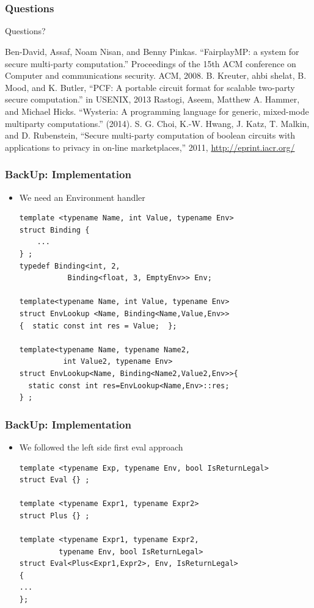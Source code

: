 \documentclass{beamer}
\begin{document}
\section*{}
\begin{frame}
\frametitle{Questions}
Questions?
\end{frame}

\begin{frame}
\begin{thebibliography}{9}
Ben-David, Assaf, Noam Nisan, and Benny Pinkas. ``FairplayMP: a system for secure multi-party computation.'' Proceedings of the 15th ACM conference on Computer and communications security. ACM, 2008.
 B. Kreuter, ahbi shelat, B. Mood, and K. Butler, ``PCF: A portable
circuit format for scalable two-party secure computation.'' in USENIX,
2013
Rastogi, Aseem, Matthew A. Hammer, and Michael Hicks. ``Wysteria: A programming language for generic, mixed-mode multiparty computations.'' (2014).
S. G. Choi, K.-W. Hwang, J. Katz, T. Malkin, and D. Rubenstein,
“Secure multi-party computation of boolean circuits with applications to
privacy in on-line marketplaces,” 2011, \url{http://eprint.iacr.org/}
\end{thebibliography}
\end{frame}

\begin{frame}[fragile]
\frametitle{BackUp: Implementation}
\begin{itemize}
\item We need an Environment handler
\begin{lstlisting}
template <typename Name, int Value, typename Env>
struct Binding {
    ...
} ;
typedef Binding<int, 2,
           Binding<float, 3, EmptyEnv>> Env;
           
template<typename Name, int Value, typename Env>
struct EnvLookup <Name, Binding<Name,Value,Env>> 
{  static const int res = Value;  };

template<typename Name, typename Name2,
          int Value2, typename Env>
struct EnvLookup<Name, Binding<Name2,Value2,Env>>{
  static const int res=EnvLookup<Name,Env>::res;
} ;
\end{lstlisting}
\end{itemize}
\end{frame}

\begin{frame}[fragile]
\frametitle{BackUp: Implementation}
\begin{itemize}
\item We followed the left side first eval approach
\begin{lstlisting}
template <typename Exp, typename Env, bool IsReturnLegal>
struct Eval {} ;

template <typename Expr1, typename Expr2>
struct Plus {} ;

template <typename Expr1, typename Expr2,
         typename Env, bool IsReturnLegal>
struct Eval<Plus<Expr1,Expr2>, Env, IsReturnLegal>
{
...
};
\end{lstlisting}
\end{itemize}
\end{frame}
\end{document}
